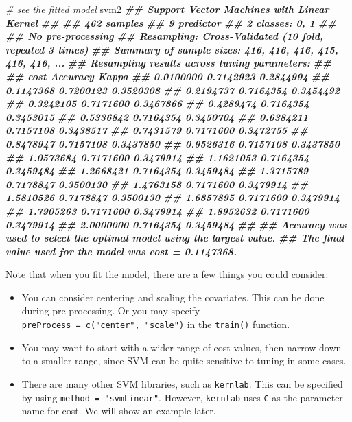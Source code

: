 \documentclass[
]{book}
\newenvironment{Shaded}{\begin{snugshade}}{\end{snugshade}}
\newcommand{\CommentTok}[1]{\textcolor[rgb]{0.56,0.35,0.01}{\textit{#1}}}
\newcommand{\DocumentationTok}[1]{\textcolor[rgb]{0.56,0.35,0.01}{\textbf{\textit{#1}}}}
\newcommand{\NormalTok}[1]{#1}
\providecommand{\tightlist}{%
  \setlength{\itemsep}{0pt}\setlength{\parskip}{0pt}}
\theoremstyle{definition}
\theoremstyle{definition}
\theoremstyle{definition}
\theoremstyle{definition}
\theoremstyle{remark}
\begin{document}
\begin{Shaded}
\begin{Highlighting}[]
  \CommentTok{\# see the fitted model}
\NormalTok{  svm2}
\DocumentationTok{\#\# Support Vector Machines with Linear Kernel }
\DocumentationTok{\#\# }
\DocumentationTok{\#\# 462 samples}
\DocumentationTok{\#\#   9 predictor}
\DocumentationTok{\#\#   2 classes: \textquotesingle{}0\textquotesingle{}, \textquotesingle{}1\textquotesingle{} }
\DocumentationTok{\#\# }
\DocumentationTok{\#\# No pre{-}processing}
\DocumentationTok{\#\# Resampling: Cross{-}Validated (10 fold, repeated 3 times) }
\DocumentationTok{\#\# Summary of sample sizes: 416, 416, 416, 415, 416, 416, ... }
\DocumentationTok{\#\# Resampling results across tuning parameters:}
\DocumentationTok{\#\# }
\DocumentationTok{\#\#   cost       Accuracy   Kappa    }
\DocumentationTok{\#\#   0.0100000  0.7142923  0.2844994}
\DocumentationTok{\#\#   0.1147368  0.7200123  0.3520308}
\DocumentationTok{\#\#   0.2194737  0.7164354  0.3454492}
\DocumentationTok{\#\#   0.3242105  0.7171600  0.3467866}
\DocumentationTok{\#\#   0.4289474  0.7164354  0.3453015}
\DocumentationTok{\#\#   0.5336842  0.7164354  0.3450704}
\DocumentationTok{\#\#   0.6384211  0.7157108  0.3438517}
\DocumentationTok{\#\#   0.7431579  0.7171600  0.3472755}
\DocumentationTok{\#\#   0.8478947  0.7157108  0.3437850}
\DocumentationTok{\#\#   0.9526316  0.7157108  0.3437850}
\DocumentationTok{\#\#   1.0573684  0.7171600  0.3479914}
\DocumentationTok{\#\#   1.1621053  0.7164354  0.3459484}
\DocumentationTok{\#\#   1.2668421  0.7164354  0.3459484}
\DocumentationTok{\#\#   1.3715789  0.7178847  0.3500130}
\DocumentationTok{\#\#   1.4763158  0.7171600  0.3479914}
\DocumentationTok{\#\#   1.5810526  0.7178847  0.3500130}
\DocumentationTok{\#\#   1.6857895  0.7171600  0.3479914}
\DocumentationTok{\#\#   1.7905263  0.7171600  0.3479914}
\DocumentationTok{\#\#   1.8952632  0.7171600  0.3479914}
\DocumentationTok{\#\#   2.0000000  0.7164354  0.3459484}
\DocumentationTok{\#\# }
\DocumentationTok{\#\# Accuracy was used to select the optimal model using the largest value.}
\DocumentationTok{\#\# The final value used for the model was cost = 0.1147368.}
\end{Highlighting}
\end{Shaded}

Note that when you fit the model, there are a few things you could consider:

\begin{itemize}
\tightlist
\item
  You can consider centering and scaling the covariates. This can be done during pre-processing. Or you may specify \texttt{preProcess\ =\ c("center",\ "scale")} in the \texttt{train()} function.
\item
  You may want to start with a wider range of cost values, then narrow down to a smaller range, since SVM can be quite sensitive to tuning in some cases.
\item
  There are many other SVM libraries, such as \texttt{kernlab}. This can be specified by using \texttt{method\ =\ "svmLinear"}. However, \texttt{kernlab} uses \texttt{C} as the parameter name for cost. We will show an example later.
\end{itemize}
\end{document}
